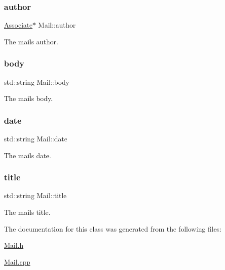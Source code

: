 \subsubsection{\texorpdfstring{author}{author}}
{\footnotesize\ttfamily \mbox{\hyperlink{classAssociate}{Associate}}$\ast$ Mail\+::author\hspace{0.3cm}{\ttfamily [private]}}



The mail\textquotesingle{}s author. 

\mbox{\label{classMail_aaa91a94ee92b2712218a9cae389554f7}} 
\subsubsection{\texorpdfstring{body}{body}}
{\footnotesize\ttfamily std\+::string Mail\+::body\hspace{0.3cm}{\ttfamily [private]}}



The mail\textquotesingle{}s body. 

\mbox{\label{classMail_aee9bc87682f6173b92bf135397f38162}} 
\subsubsection{\texorpdfstring{date}{date}}
{\footnotesize\ttfamily std\+::string Mail\+::date\hspace{0.3cm}{\ttfamily [private]}}



The mail\textquotesingle{}s date. 

\mbox{\label{classMail_a2f54f71a529dec6345d84ae60562b207}} 
\subsubsection{\texorpdfstring{title}{title}}
{\footnotesize\ttfamily std\+::string Mail\+::title\hspace{0.3cm}{\ttfamily [private]}}



The mail\textquotesingle{}s title. 



The documentation for this class was generated from the following files\+:\begin{DoxyCompactItemize}
\item 
\mbox{\hyperlink{Mail_8h}{Mail.\+h}}\item 
\mbox{\hyperlink{Mail_8cpp}{Mail.\+cpp}}\end{DoxyCompactItemize}

